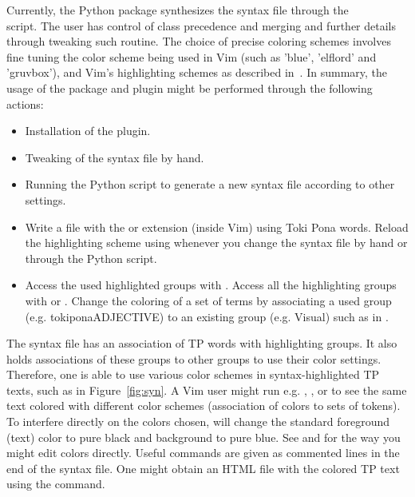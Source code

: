 Currently, the Python package synthesizes the
syntax file through the\\  script.
The user has control of class precedence and
merging and further details through tweaking such routine.
The choice of precise coloring schemes
involves fine tuning the color scheme being
used in Vim (such as 'blue', 'elflord' and 'gruvbox'),
and Vim's highlighting schemes as described in~\cite{vim}.
In summary,
the usage of the package and plugin might be performed
through the following actions:
\begin{itemize}
  \item Installation of the plugin.
  \item Tweaking of the syntax file by hand.
  \item Running the 
    Python script to generate a new  syntax file
    according to other settings.
  \item Write a file with the  or  extension
    (inside Vim) using Toki Pona words.
    Reload the highlighting scheme using  whenever you
    change the syntax file by hand or through the Python script.
  \item Access the used highlighted groups with .
    Access all the highlighting groups with  or .
    Change the coloring of a set of terms by associating
    a used group (e.g. tokiponaADJECTIVE) to an existing group (e.g.
    Visual) such as in .
\end{itemize}

The syntax file has an association of TP
words with highlighting groups.
It also holds associations of these groups to other groups
to use their color settings.
Therefore, one is able to use various color schemes
in syntax-highlighted TP texts, such as in Figure~\ref{fig:syn}.
A Vim user might run e.g. ,
,  or
 to see the same text colored
with different color schemes (association of colors to sets of tokens).
To interfere directly on the colors chosen,
will change the standard foreground (text) color to pure black
and background to pure blue.
See  and 
for the way you might edit colors directly.
Useful commands are given as commented lines
in the end of the syntax file. %
One might obtain an HTML file with the colored TP text
using the  command.

